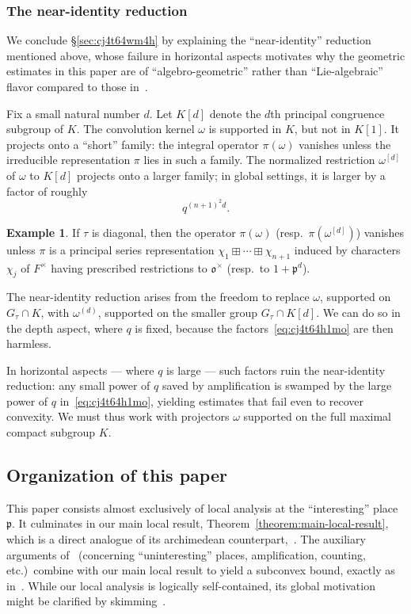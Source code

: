 \documentclass[reqno]{amsart}
\theoremstyle{plain} \newtheorem{theorem} {Theorem} \newtheorem{conjecture} {Conjecture} \newtheorem{corollary} [theorem] {Corollary} \newtheorem{proposition} [theorem] {Proposition} \newtheorem{fact} [theorem] {Fact}
\theoremstyle{definition} \newtheorem{definition} [theorem] {Definition}
\newtheorem{example} [theorem] {Example} \newtheorem{assertion}
\theoremstyle{itplain} %
\begin{document}
\subsubsection{The near-identity reduction}\label{sec:cj4t69an73}
We conclude \S\ref{sec:cj4t64wm4h} by explaining the ``near-identity'' reduction mentioned above, whose failure in horizontal aspects motivates why the geometric estimates in this paper are of ``algebro-geometric'' rather than ``Lie-algebraic'' flavor compared to those in~\cite{2020arXiv201202187N}.

Fix a small natural number $d$.  Let $K[d]$ denote the $d$th principal congruence subgroup of $K$.  The convolution kernel $\omega$ is supported in $K$, but not in $K[1]$.  It projects onto a ``short'' family: the integral operator $\pi(\omega)$ vanishes unless the irreducible representation $\pi$ lies in such a family. The normalized restriction $\omega^{[d]}$ of $\omega$ to $K[d]$ projects onto a larger family; in global settings, it is larger by a factor of roughly
\begin{equation}\label{eq:cj4t64h1mo}
  q^{{(n+1)}^2 d}.
\end{equation}
\begin{example}
  If $\tau$ is diagonal, then the operator $\pi(\omega)$ (resp.\ $\pi(\omega^{[d]})$) vanishes unless $\pi$ is a principal series representation $\chi_1 \boxplus \dotsb \boxplus \chi_{n+1}$ induced by characters $\chi_j$ of $F^\times$ having prescribed restrictions to $\mathfrak{o}^\times$ (resp.\ to $1 + \mathfrak{p}^d$).
\end{example}
The near-identity reduction arises from the freedom to replace $\omega$, supported on $G_\tau \cap K$, with $\omega^{(d)}$, supported on the smaller group $G_\tau \cap K[d]$.  We can do so in the depth aspect, where $q$ is fixed, because the factors~\eqref{eq:cj4t64h1mo} are then harmless.

In horizontal aspects --- where $q$ is large --- such factors ruin the near-identity reduction: any small power of $q$ saved by amplification is swamped by the large power of $q$ in~\eqref{eq:cj4t64h1mo}, yielding estimates that fail even to recover convexity.  We must thus work with projectors $\omega$ supported on the full maximal compact subgroup $K$.


\subsection{Organization of this paper}
This paper consists almost exclusively of local analysis at the ``interesting'' place $\mathfrak{p}$.  It culminates in our main local result, Theorem~\ref{theorem:main-local-result}, which is a direct analogue of its archimedean counterpart,~\cite[Theorem 4.2]{2020arXiv201202187N}.  The auxiliary arguments of~\cite[\S4--6]{2020arXiv201202187N} (concerning ``uninteresting'' places, amplification, counting, etc.)\ combine with our main local result to yield a subconvex bound, exactly as in~\cite{2020arXiv201202187N}.  While our local analysis is logically self-contained, its global motivation might be clarified by skimming~\cite[\S6]{2020arXiv201202187N}.
\end{document}
